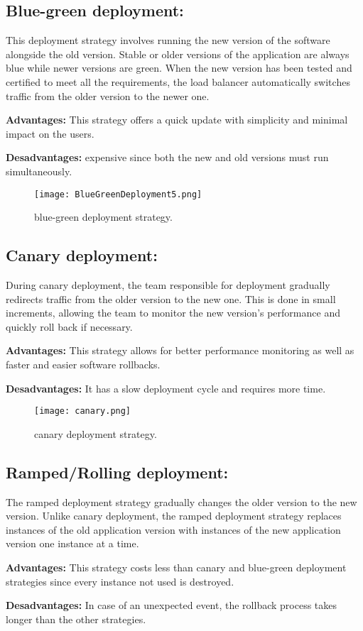 \subsection*{Blue-green deployment:}
This deployment strategy involves running the new version of the software alongside the old version.
Stable or older versions of the application are always blue while newer versions are green.
When the new version has been tested and certified to meet all the requirements, the load balancer automatically switches traffic from the older version to the newer one.
\par \noindent \textbf{Advantages:} This strategy offers a quick update with simplicity and minimal impact on the users.
\par \noindent \textbf{Desadvantages:} expensive since both the new and old versions must run simultaneously.

\begin{figure}[htbp]
    \centering
    \texttt{[image: BlueGreenDeployment5.png]}
    \caption{blue-green deployment strategy.}
    \label{fig:blue-green-deployment-strategy}
\end{figure}

\subsection*{Canary deployment:}
During canary deployment, the team responsible for deployment gradually redirects traffic from the older version to the new one.
This is done in small increments, allowing the team to monitor the new version's performance and quickly roll back if necessary.
\par \noindent \textbf{Advantages:} This strategy allows for better performance monitoring as well as faster and easier software rollbacks.
\par \noindent \textbf{Desadvantages:} It has a slow deployment cycle and requires more time.

\begin{figure}[htbp]
    \centering
    \texttt{[image: canary.png]}
    \caption{canary deployment strategy.}
    \label{fig:canary-deployment-strategy}
\end{figure}

\subsection*{Ramped/Rolling deployment:}
The ramped deployment strategy gradually changes the older version to the new version. Unlike canary deployment, the ramped deployment strategy replaces instances of the old application version with instances of the new application version one instance at a time.
\par \noindent \textbf{Advantages:} This strategy costs less than canary and blue-green deployment strategies since every instance not used is destroyed.
\par \noindent \textbf{Desadvantages:} In case of an unexpected event, the rollback process takes longer than the other strategies.

